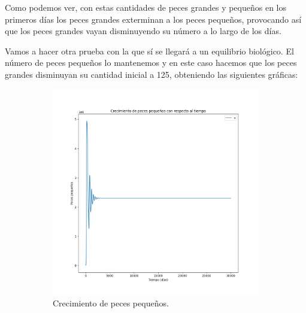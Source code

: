 \documentclass[11pt,a4paper]{report}
\begin{document}
Como podemos ver, con estas cantidades de peces grandes y pequeños en los primeros días los peces grandes exterminan a los peces pequeños, provocando así que los peces grandes vayan disminuyendo su número a lo largo de los días.

Vamos a hacer otra prueba con la que sí se llegará a un equilibrio biológico. El número de peces pequeños lo mantenemos y en este caso hacemos que los peces grandes disminuyan su cantidad inicial a 125, obteniendo las siguientes gráficas:

\begin{figure}[H]
  \begin{subfigure}[b]{0.49\textwidth}
    \includegraphics[width=\textwidth, height=\textwidth]{img/Cap-3/apartado-1/peces_pequenos_125.png}
    \caption{Crecimiento de peces pequeños.}
    \label{fig:f1}
  \end{subfigure}
  \hfill
  \begin{subfigure}[b]{0.49\textwidth}

\end{subfigure}
\end{figure}
\end{document}
